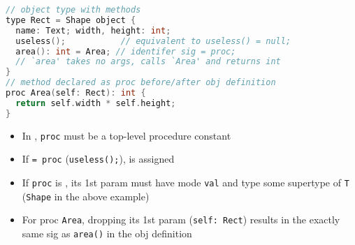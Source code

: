 \documentclass[10pt,a4paper,landscape]{article}
\begin{document}
\begin{multicols*}{3}
\begin{minipage}{\linewidth}
\begin{lstlisting}[language=c]
// object type with methods
type Rect = Shape object {
  name: Text; width, height: int;
  useless();           // equivalent to useless() = null;
  area(): int = Area; // identifer sig = proc;
  // `area' takes no args, calls `Area' and returns int
}
// method declared as proc before/after obj definition
proc Area(self: Rect): int {
  return self.width * self.height;
}
\end{lstlisting}
\end{minipage}
\begin{itemize}
\item In , \texttt{proc} must be a top-level procedure constant
\item If \texttt{= proc}  (\texttt{useless();}),  is assigned
\item If \texttt{proc} is , its 1st param must have mode \texttt{val} and type some supertype of \texttt{T} (\texttt{Shape} in the above example)
\item For proc \texttt{Area}, dropping its 1st param (\texttt{self: Rect}) results in the exactly same sig as \texttt{area()} in the obj definition
\end{itemize}
\end{multicols*}
\end{document}

